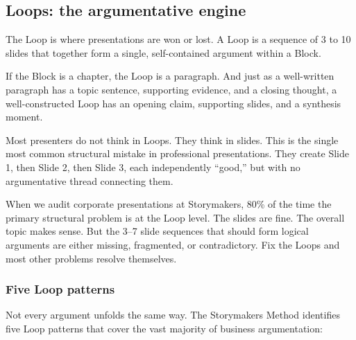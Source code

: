 \subsection{Loops: the argumentative engine}

The Loop is where presentations are won or lost. A Loop is a sequence of 3 to 10 slides that together form a single, self-contained argument within a Block.

If the Block is a chapter, the Loop is a paragraph. And just as a well-written paragraph has a topic sentence, supporting evidence, and a closing thought, a well-constructed Loop has an opening claim, supporting slides, and a synthesis moment.

Most presenters do not think in Loops. They think in slides. This is the single most common structural mistake in professional presentations. They create Slide 1, then Slide 2, then Slide 3, each independently ``good,'' but with no argumentative thread connecting them.

\begin{alertbox}
When we audit corporate presentations at Storymakers, 80\% of the time the primary structural problem is at the Loop level. The slides are fine. The overall topic makes sense. But the 3--7 slide sequences that should form logical arguments are either missing, fragmented, or contradictory. Fix the Loops and most other problems resolve themselves.
\end{alertbox}

\subsubsection{Five Loop patterns}

Not every argument unfolds the same way. The Storymakers Method identifies five Loop patterns that cover the vast majority of business argumentation:



